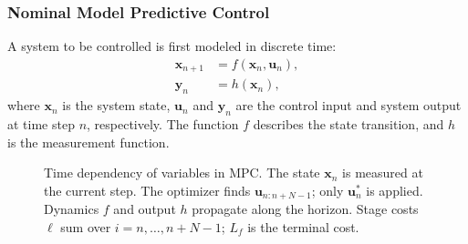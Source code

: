 \subsubsection{Nominal Model Predictive Control}
A system to be controlled is first modeled in discrete time:
\begin{subequations}
\begin{align}
    \label{eq:mpc_model}
    \boldsymbol{x}_{n+1} &= f(\boldsymbol{x}_n, \boldsymbol{u}_n), \\
    \boldsymbol{y}_n &= h(\boldsymbol{x}_n),
\end{align}
\end{subequations}
where $\boldsymbol{x}_n$ is the system state, $\boldsymbol{u}_n$ and $\boldsymbol{y}_n$ are the control input and system output at time step $n$, respectively. The function $f$ describes the state transition, and $h$ is the measurement function. 

\begin{figure}[htbp]
    \centering
    
    \caption[MPC time dependency]{Time dependency of variables in \ac{MPC}. The state $\boldsymbol{x}_n$ is measured at the current step. The optimizer finds $\boldsymbol{u}_{n:n+N-1}$; only $\boldsymbol{u}^*_n$ is applied. Dynamics $f$ and output $h$ propagate along the horizon. Stage costs $\ell$ sum over $i=n,\ldots,n+N-1$; $L_f$ is the terminal cost.}
    \label{fig:mpc_timeline}
\end{figure}

